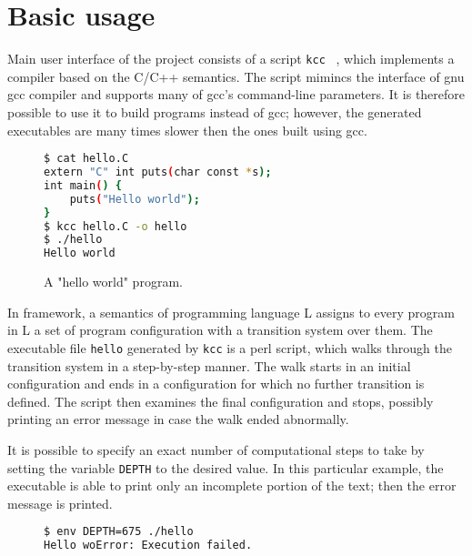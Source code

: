 \documentclass{fithesis3}
\newcommand{\kcc}{\texttt{kcc} } %
\begin{document}

\section{Basic usage}

Main user interface of the project consists of a script \kcc~\cite{hathhorn-ellison-rosu-2015-pldi}, which implements a compiler based on the C/C++ semantics. The script mimincs the interface of gnu gcc compiler and supports many of gcc's command-line parameters. It is therefore possible to use it to build programs instead of gcc; however, the generated executables are many times slower then the ones built using gcc.

\begin{figure}[h]
\begin{lstlisting}[language=bash]
$ cat hello.C
extern "C" int puts(char const *s);
int main() {
	puts("Hello world");
}
$ kcc hello.C -o hello
$ ./hello
Hello world
\end{lstlisting}
\caption{A "hello world" program.}
\label{helloWorldSource}
\end{figure}

In \K framework, a semantics of programming language L assigns to every program in L a set of program configuration with a transition system over them. The executable file \texttt{hello} generated by \kcc is a perl script, which walks through the transition system in a step-by-step manner. The walk starts in an initial configuration and ends in a configuration for which no further transition is defined. The script then examines the final configuration and stops, possibly printing an error message in case the walk ended abnormally.

It is possible to specify an exact number of computational steps to take by setting the variable \texttt{DEPTH} to the desired value. In this particular example, the executable is able to print only an incomplete portion of the text; then the error message is printed. 

\begin{figure}[h]
\begin{lstlisting}[language=bash]
$ env DEPTH=675 ./hello
Hello woError: Execution failed.
\end{lstlisting}
\end{figure}
\end{document}
